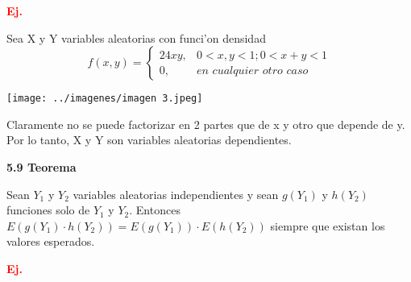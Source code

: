 \documentclass[12pt,letterpaper]{article}
\theoremstyle{definition}
\begin{document}
\textbf{\textcolor{red}{Ej.}}

Sea X y Y variables aleatorias con funci'on densidad
\[f(x,y)=\left\{
\begin{array}{rl}
	24xy,& 0<x,y<1; 0<x+y<1\\
	0, & \textit{en cualquier otro caso}
\end{array}\right.\]
\begin{center}
	\texttt{[image: ../imagenes/imagen 3.jpeg]} 
\end{center}
Claramente no se puede factorizar en 2 partes que de x y otro que depende de y. Por lo tanto, X y Y son variables aleatorias dependientes.

\textbf{5.9 Teorema}

Sean $Y_1$ y $Y_2$ variables aleatorias independientes y sean $g(Y_1)$ y $h(Y_2)$ funciones solo de $Y_1$ y $Y_2$. Entonces $E(g(Y_1)\cdot h(Y_2))=E(g(Y_1))\cdot E(h(Y_2))$ siempre que existan los valores esperados.

\textbf{\textcolor{red}{Ej.}}
\end{document}
